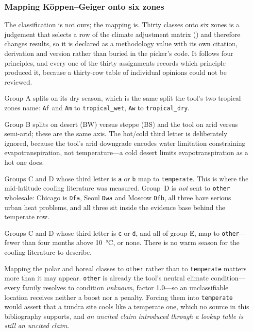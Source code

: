 \subsubsection*{Mapping K\"oppen--Geiger onto six zones}

The classification is not ours; the mapping is. Thirty classes onto six zones
is a judgement that selects a row of the climate adjustment matrix
() and therefore changes results, so it is declared
as a methodology value with its own citation, derivation and version rather
than buried in the picker's code. It follows four principles, and every one of
the thirty assignments records which principle produced it, because a
thirty-row table of individual opinions could not be reviewed.

\begin{description}[leftmargin=1.5em, style=sameline, font=\normalfont\itshape]
  \item[Tropical] Group A splits on its dry season, which is the same split the
  tool's two tropical zones name: \texttt{Af} and \texttt{Am} to
  \texttt{tropical\_wet}, \texttt{Aw} to \texttt{tropical\_dry}.

  \item[Arid] Group B splits on desert (BW) versus steppe (BS) and the tool on
  arid versus semi-arid; these are the same axis. The hot/cold third letter is
  deliberately ignored, because the tool's arid downgrade encodes water
  limitation constraining evapotranspiration, not temperature---a cold desert
  limits evapotranspiration as a hot one does.

  \item[Warm season] Groups C and D whose third letter is \texttt{a} or
  \texttt{b} map to \texttt{temperate}. This is where the mid-latitude cooling
  literature was measured. Group~D is \emph{not} sent to \texttt{other}
  wholesale: Chicago is \texttt{Dfa}, Seoul \texttt{Dwa} and Moscow
  \texttt{Dfb}, all three have serious urban heat problems, and all three sit
  inside the evidence base behind the temperate row.

  \item[No warm season] Groups C and D whose third letter is \texttt{c} or
  \texttt{d}, and all of group E, map to \texttt{other}---fewer than four
  months above \SI{10}{\degreeCelsius}, or none. There is no warm season for
  the cooling literature to describe.
\end{description}

Mapping the polar and boreal classes to \texttt{other} rather than to
\texttt{temperate} matters more than it may appear. \texttt{other} is already
the tool's neutral climate condition---every family resolves to condition
\emph{unknown}, factor \num{1.0}---so an unclassifiable location receives
neither a boost nor a penalty. Forcing them into \texttt{temperate} would
assert that a tundra site cools like a temperate one, which no source in this
bibliography supports, and \emph{an uncited claim introduced through a lookup
table is still an uncited claim}.

